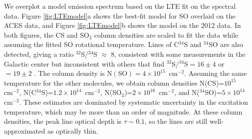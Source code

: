 \documentclass[]{aastex631}
\newcommand{\persc}{\ensuremath{\mathrm{cm}^{-2}}\xspace}
\begin{document}
We overplot a model emission spectrum based on the LTE fit on the spectral data.
Figure \ref{fig:LTEmodel}a shows the best-fit model for SO overlaid on the ACES data, and Figure \ref{fig:LTEmodel}b shows the model on the 2012 data.
In both figures, the CS and SO$_2$ column densities are scaled to fit the data while assuming the fitted SO rotational temperature.
Lines of C$^{34}$S and $^{34}$SO are also detected, giving a ratio $^{32}$S/$^{34}$S $\approx$ 8, consistent with some measurements in the Galactic center \citep{Yu2020} but inconsistent with others that find $^{32}$S/$^{34}$S$=16\pm4$ \citep{Humire2020} or $=19\pm2$ \citep{Yan2023}.
The column density is $\mathrm{N(SO)}=4\times10^{15}$~\persc.
Assuming the same temperature for the other molecules, we obtain column densities N(CS)=$10^{15}$ \persc, N(C$^{34}$S)=$1.2\times10^{14}$~\persc, N(SO$_2$)=$2\times10^{16}$~\persc, and N($^{34}$SO)=$5\times10^{14}$~\persc.
These estimates are dominated by systematic uncertainty in the excitation temperature, which may be more than an order of magnitude.
At these column densities, the peak line optical depth is $\tau \sim 0.1$, so the lines are still well-approximated as optically thin.
    
\end{document}
